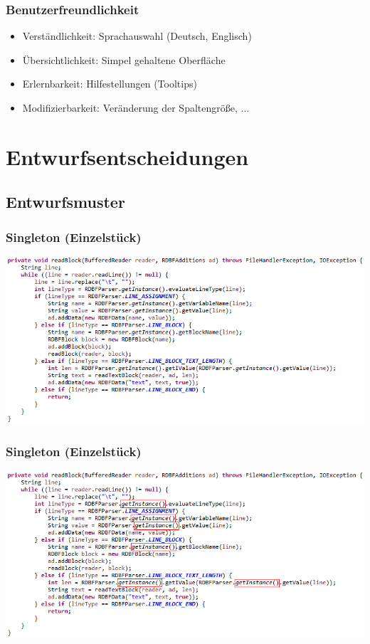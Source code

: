 \documentclass{beamer}
\begin{document}
\begin{frame}
\frametitle{Benutzerfreundlichkeit}
\begin{itemize}
\item Verständlichkeit: Sprachauswahl (Deutsch, Englisch)
\item Übersichtlichkeit: Simpel gehaltene Oberfläche
\item Erlernbarkeit: Hilfestellungen (Tooltips)
\item Modifizierbarkeit: Veränderung der Spaltengröße, ...
\end{itemize}
\end{frame}

\section{Entwurfsentscheidungen}
\subsection{Entwurfsmuster}
\begin{frame}
\frametitle{Singleton (Einzelstück)}
\includegraphics[scale=0.5]{../document_data/loadRDBFFile.png}
\end{frame}
\begin{frame}
\frametitle{Singleton (Einzelstück)}
\includegraphics[scale=0.5]{../document_data/loadRDBFFile_instanceMarked.png}
\end{frame}
\end{document}
